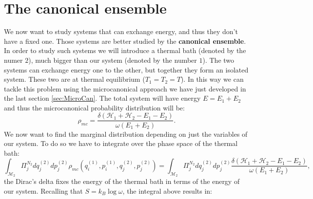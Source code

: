 \section{The canonical ensemble}
We now want to study systems that can exchange energy, and thus they don't have a fixed one. Those systems are better studied by the \textbf{canonical ensemble}.\\
In order to study such systems we will introduce a thermal bath (denoted by the numer $2$), much bigger than our system (denoted by the number $1$).  The two systems can exchange energy one to the other, but together they form an isolated system. These two are at thermal equilibrium ($T_1=T_2=T$). In this way we can tackle this problem using the microcanonical approach we have just developed in the last section \ref{sec:MicroCan}. The total system will have energy $E=E_1+E_2$ and thus the microcanonical probability distribution will be:
\begin{equation*}
    \rho_{mc}=\frac{\delta(\mathcal{H}_1+\mathcal{H}_2-E_1-E_2)}{\omega(E_1+E_2)}.
\end{equation*}
We now want to find the marginal distribution depending on just the variables of our system. To do so we have to integrate over the phase space of the thermal bath:
\begin{equation*}
    \int_{\mathcal{M}_2 }\Pi^{N_2}_j dq^{(2)}_jdp^{(2)}_j\rho_{mc}(q^{(1)}_i,p^{(1)}_i,q^{(2)}_j,p^{(2)}_j)=\int_{\mathcal{M}_2 }\Pi^{N_2}_j dq^{(2)}_jdp^{(2)}_j\frac{\delta(\mathcal{H}_1+\mathcal{H}_2-E_1-E_2)}{\omega(E_1+E_2)},
\end{equation*}
the Dirac's delta fixes the energy of the thermal bath in terms of the energy of our system. Recalling that $S=k_B\log\omega$, the integral above results in:
